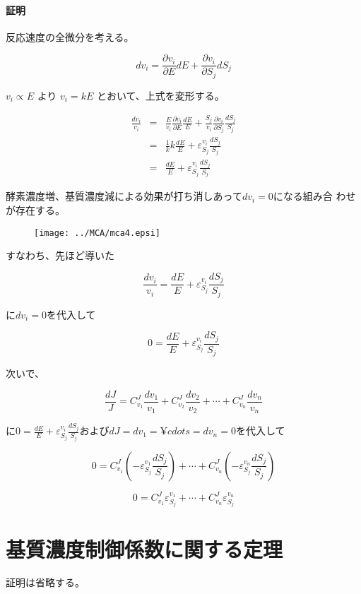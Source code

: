 \paragraph{証明}
反応速度の全微分を考える。

\[dv_i = \frac{\partial v_i}{\partial E} dE + \frac{\partial v_i}{\partial S_j} dS_j\]

\(v_i \propto E\) より \(v_i = k E\) とおいて、上式を変形する。

\begin{eqnarray*}
\frac{dv_i}{v_i} & = &\frac{E}{v_i}\frac{\partial v_i}{\partial E}\frac{dE}{E} + \frac{S_j}{v_i}\frac{\partial v_i}{\partial S_j} \frac{dS_j}{S_j}\\
& = & \frac{1}{k} k \frac{dE}{E} + \varepsilon^{v_i}_{S_j} \frac{dS_j}{S_j}\\
& = & \frac{dE}{E} + \varepsilon^{v_i}_{S_j}\frac{dS_j}{S_j}
\end{eqnarray*}

酵素濃度増、基質濃度減による効果が打ち消しあって\(dv_i=0\)になる組み合
わせが存在する。

\begin{figure}[h]
\begin{center}
\texttt{[image: ../MCA/mca4.epsi]}
\end{center}
\end{figure}

すなわち、先ほど導いた

\[\frac{dv_i}{v_i} = \frac{dE}{E} + \varepsilon^{v_i}_{S_j}\frac{dS_j}{S_j}\]

に\(dv_i=0\)を代入して

\[0  = \frac{dE}{E} + \varepsilon^{v_i}_{S_j}\frac{dS_j}{S_j}\]

次いで、

\[\frac{dJ} {J}   =  C^J_{v_1}\frac{dv_1}{v_1} + C^J_{v_2}\frac{dv_2}{v_2} + \cdots + C^J_{v_n}\frac{dv_n}{v_n}\]

に\(0  = \frac{dE}{E} + \varepsilon^{v_i}_{S_j}\frac{dS_j}{S_j}\)および\(dJ = dv_1 = ¥cdots = dv_n = 0\)を代入して

\[0 = C^J_{v_1} \left( -\varepsilon^{v_1}_{S_j} \frac{dS_j}{S_j}\right)+\cdots+C^J_{v_n} \left( -\varepsilon^{v_n}_{S_j} \frac{dS_j}{S_j}\right) \]

\[0 = C^J_{v_1} \varepsilon^{v_1}_{S_j} +\cdots+C^J_{v_n} \varepsilon^{v_n}_{S_j}\]

\section{基質濃度制御係数に関する定理}
証明は省略する。
